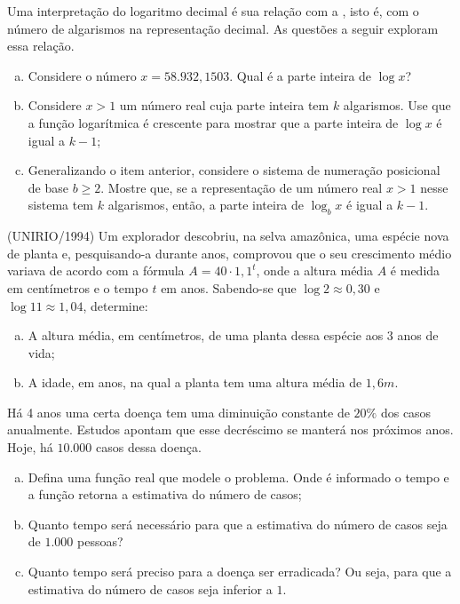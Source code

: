 \begin{exercise}
    Uma interpretação do logaritmo decimal é sua relação com a
, isto é, com o número de algarismos na
representação decimal. As questões a seguir exploram essa relação.
\begin{enumerate}[a)]
  \item Considere o número $x = 58.932{,}1503$. Qual é a parte inteira de $\log x$?
  \item Considere $x>1$ um número real cuja parte inteira tem $k$ algarismos.
  Use que a função logarítmica é crescente para mostrar que a parte inteira
  de $\log x$ é igual a $k-1$;
  \item Generalizando o item anterior, considere o sistema de
  numeração posicional de base $b \geq 2$. Mostre que, se a
  representação de um número real $x>1$ nesse sistema tem $k$
  algarismos, então, a parte inteira de $\log_b x$ é igual a $k-1$.
\end{enumerate}
\end{exercise}

\begin{exercise}
    (UNIRIO/1994) Um explorador descobriu, na selva amazônica, uma
espécie nova de planta e, pesquisando-a durante anos, comprovou que
o seu crescimento médio variava de acordo com a fórmula $A = 40
\cdot 1{,}1^t$, onde a altura média $A$ é medida em centímetros e o
tempo $t$ em anos. Sabendo-se que $\log 2 \approx 0{,}30$ e $\log 11
\approx 1{,}04$, determine:
\begin{enumerate}[a)]
  \item A altura média, em centímetros, de uma planta dessa espécie
  aos 3 anos de vida;
  \item A idade, em anos, na qual a planta tem uma altura média de
  $1{,}6 m$.
\end{enumerate}
\end{exercise}

\begin{exercise}
    Há 4 anos uma certa doença tem uma diminuição constante de $20\%$ dos casos anualmente. Estudos apontam que esse decréscimo se manterá nos próximos anos. Hoje, há $10.000$ casos dessa doença. 

        \begin{enumerate}[a)]
            \item Defina uma função real que modele o problema. Onde é informado o tempo e a função retorna a estimativa do número de casos;
            \item Quanto tempo será necessário para que a estimativa do número de casos seja de $1.000$ pessoas?
            \item Quanto tempo será preciso para a doença ser erradicada? Ou seja, para que a estimativa do número de casos seja inferior a $1$.
            \end{enumerate}
\end{exercise}

